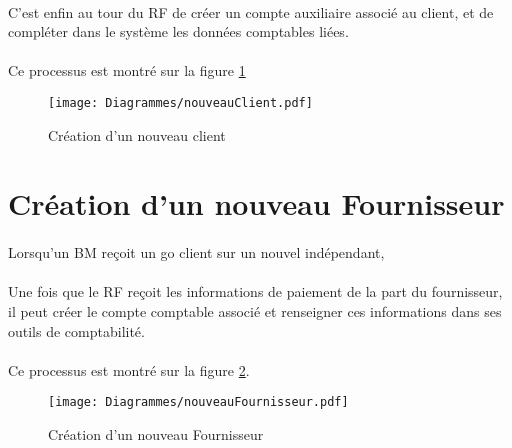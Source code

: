 \paragraph{} C'est enfin au tour du RF de créer un compte auxiliaire associé au client, et de compléter dans le système les données comptables liées.


\paragraph{}Ce processus est montré sur la figure \ref{nouveauClient}

\begin{figure}
	\centering
	\texttt{[image: Diagrammes/nouveauClient.pdf]}
	\caption{Création d'un nouveau client}
	\label{nouveauClient}
\end{figure}




\section{Création d'un nouveau Fournisseur}

\paragraph{} Lorsqu'un BM reçoit un go client sur un nouvel indépendant, 

\paragraph{} Une fois que le RF reçoit les informations de paiement de la part du fournisseur, il peut créer le compte comptable associé et renseigner ces informations dans ses outils de comptabilité.


\paragraph{}Ce processus est montré sur la figure \ref{nouveauFournisseur}.

\begin{figure}
	\centering
	\texttt{[image: Diagrammes/nouveauFournisseur.pdf]}
	\caption{Création d'un nouveau Fournisseur}
	\label{nouveauFournisseur}
\end{figure}

